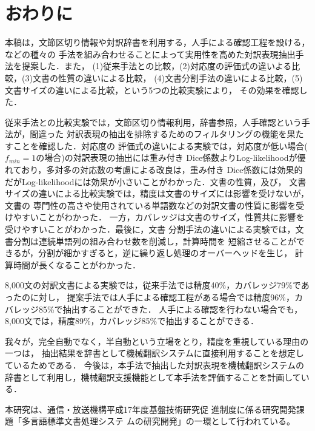 \section{おわりに}
\label{まとめ}

本稿は，文節区切り情報や対訳辞書を利用する，人手による確認工程を設ける，などの種々の
手法を組み合わせることによって実用性を高めた対訳表現抽出手法を提案した．また，
(1)従来手法との比較，(2)対応度の評価式の違いよる比較，(3)文書の性質の違いによる比較，
(4)文書分割手法の違いによる比較，(5)文書サイズの違いによる比較，という5つの比較実験により，
その効果を確認した．

従来手法との比較実験では，文節区切り情報利用，辞書参照，人手確認という手法が，間違った
対訳表現の抽出を排除するためのフィルタリングの機能を果たすことを確認した．対応度の
評価式の違いによる実験では，対応度が低い場合($f_{min}=1$の場合)の対訳表現の抽出には重み付き
Dice係数よりLog-likelihoodが優れており，多対多の対応数の考慮による改良は，重み付き
Dice係数には効果的だがLog-likelihoodには効果が小さいことがわかった．文書の性質，及び，
文書サイズの違いによる比較実験では，精度は文書のサイズには影響を受けないが，文書の
専門性の高さや使用されている単語数などの対訳文書の性質に影響を受けやすいことがわかった．
一方，カバレッジは文書のサイズ，性質共に影響を受けやすいことがわかった．最後に，文書
分割手法の違いによる実験では，文書分割は連続単語列の組み合わせ数を削減し，計算時間を
短縮させることができるが，分割が細かすぎると，逆に繰り返し処理のオーバーヘッドを生じ，
計算時間が長くなることがわかった．

8,000文の対訳文書による実験では，従来手法では精度40\%，カバレッジ79\%であったのに対し，
提案手法では人手による確認工程がある場合では精度96\%，カバレッジ85\%で抽出することができた．
人手による確認を行わない場合でも，8,000文では，精度89\%，カバレッジ85\%で抽出することができる．

我々が，完全自動でなく，半自動という立場をとり，精度を重視している理由の一つは，
抽出結果を辞書として機械翻訳システムに直接利用することを想定しているためである．
今後は，本手法で抽出した対訳表現を機械翻訳システム\cite{Kitamura-Murata:2003}の
辞書として利用し，機械翻訳支援機能として本手法を評価することを計画している．


\acknowledgment

本研究は、通信・放送機構平成17年度基盤技術研究促
進制度に係る研究開発課題「多言語標準文書処理システ
ムの研究開発」の一環として行われている。


